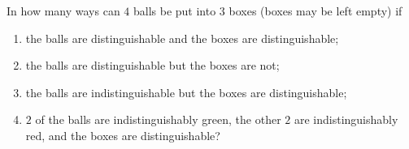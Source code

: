 In how many ways can $4$ balls be put into $3$ boxes (boxes may be left empty) if
\begin{enumerate}
\item[(a)] the balls are distinguishable and the boxes are distinguishable;
\item[(b)] the balls are distinguishable but the boxes are not;
\item[(c)] the balls are indistinguishable but the boxes are distinguishable;
\item[(d)] $2$ of the balls are indistinguishably green, the other $2$ are indistinguishably red, and the boxes are distinguishable?
\end{enumerate}
